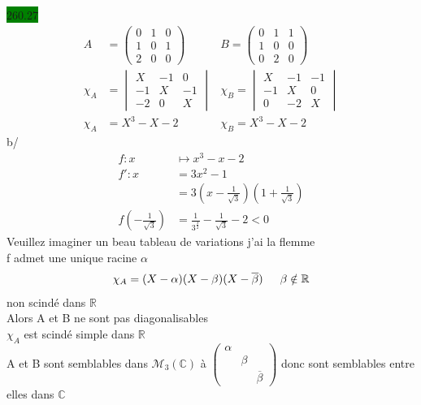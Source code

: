 \documentclass{article}
\begin{document}
\noindent \colorbox{green}{260.27}\\
\begin{align*}
    A &= \begin{pmatrix}
        0 & 1 & 0 \\ 1& 0 & 1\\ 2& 0 & 0
    \end{pmatrix} &B = \begin{pmatrix}
        0 & 1 & 1\\ 1& 0 & 0\\ 0 & 2 & 0
    \end{pmatrix}\\
    \chi_A &= \begin{vmatrix}
        X&-1&0\\-1&X&-1\\-2&0&X
    \end{vmatrix} &\chi_B = \begin{vmatrix}
        X&-1&-1\\-1&X&0\\0&-2&X
    \end{vmatrix}\\
    \chi_A &= X^3 - X - 2 &\chi_B = X^3 - X - 2
\end{align*}
b/ \begin{align*}
    f:x &\mapsto x^3 - x - 2\\
    f':x &= 3x^2 -1\\
    &= 3(x-\frac{1}{\sqrt{3}})(1+\frac{1}{\sqrt{3}})\\
    f(-\frac{1}{\sqrt{3}}) &= \frac{1}{3^\frac{3}{2}} - \frac{1}{\sqrt{3}}-2 < 0
\end{align*}
Veuillez imaginer un beau tableau de variations j'ai la flemme\\
f admet une unique racine \(\alpha\) \begin{align*}
    \chi_A = (X-\alpha)(X-\beta)(X-\overline{\beta}) \indent \beta \notin \mathbb{R}
\end{align*}
non scindé dans \(\mathbb{R}\) \\
Alors A et B ne sont pas diagonalisables\\
\(\chi_A\) est scindé simple dans \(\mathbb{R}\)\\
A et B sont semblables dans \(\mathcal{M}_3(\mathbb{C})\)
à \(\begin{pmatrix}
    \alpha & & \\ & \beta & \\ & & \overline{\beta}
\end{pmatrix}\) donc sont semblables entre elles dans \(\mathbb{C}\)\\
\end{document}
